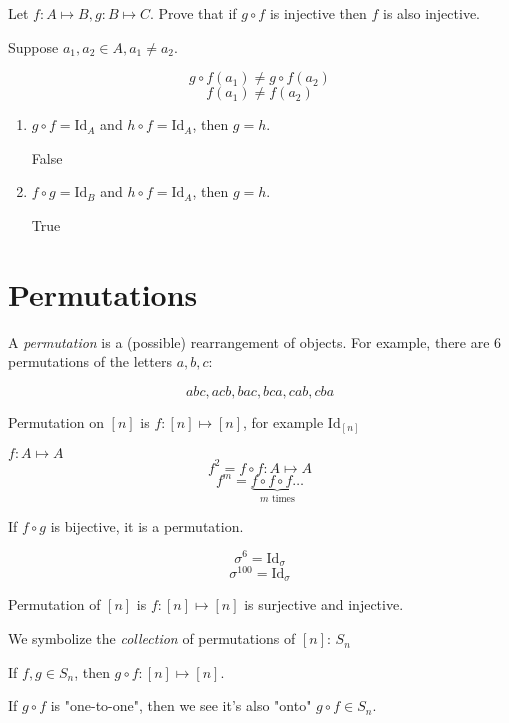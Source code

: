 \documentclass[00_complete]{subfiles}
\begin{document}
\begin{example}
    \begin{enumerate}
Let $f: A \mapsto B, g: B \mapsto C$. Prove that if $g \circ f$ is injective
then $f$ is also injective.

Suppose $a_1, a_2 \in A, a_1 \neq a_2$.

$$g \circ f(a_1) \neq g \circ f(a_2)$$
$$f(a_1) \neq f(a_2)$$
    \end{enumerate}
\end{example}

\begin{example}
\begin{enumerate}
Let $f: A \mapsto B, g: B \mapsto A, h: B \mapsto A$

 \item $g \circ f = \mathrm{Id}_A$ and $h \circ f = \mathrm{Id}_A$, then $g=h$.

False

\item $f \circ g = \mathrm{Id}_B$ and $h \circ f = \mathrm{Id}_A$, then $g=h$.

True
\end{enumerate}
\end{example}

\section{Permutations}

A \emph{permutation} is a (possible) rearrangement of objects. For example,
there are 6 permutations of the letters $a, b, c$:

$$abc, acb, bac, bca, cab, cba$$

Permutation on $[n]$ is $f: [n] \mapsto [n]$, for example $\mathrm{Id}_{[n]}$

$f: A \mapsto A$
$$f^2 = f \circ f: A \mapsto A$$
$$f^m = \underbrace{f \circ f \circ f \ldots}_{m \text{ times}}$$

If $f \circ g$ is bijective, it is a permutation.

$$\sigma^6 = \mathrm{Id}_{\sigma}$$
$$\sigma^{100} = \mathrm{Id}_{\sigma}$$


\begin{definition}[Permutation]
Permutation of $[n]$ is $f: [n] \mapsto [n]$ is surjective and injective.

We symbolize the \emph{collection} of permutations of $[n]$: $S_n$

If $f, g \in S_n$, then $g \circ f: [n] \mapsto [n]$.

If $g \circ f$ is "one-to-one", then we see it's also "onto" $g \circ f \in
S_n$.
\end{definition}
\end{document}

